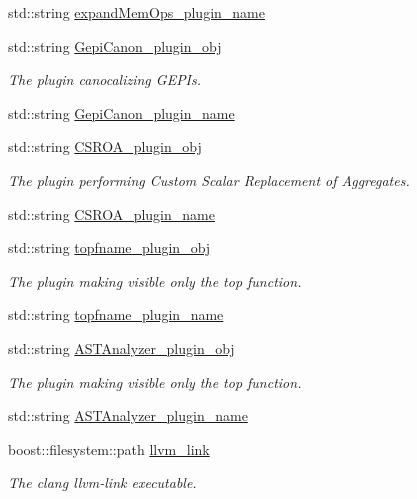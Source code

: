\begin{DoxyCompactItemize}
std\+::string \hyperlink{classGccWrapper_1_1Compiler_a1d172d22af2ec0499c96c54b9641e8fd}{expand\+Mem\+Ops\+\_\+plugin\+\_\+name}
\item 
std\+::string \hyperlink{classGccWrapper_1_1Compiler_a138c2372406ec671bf265a3272faffad}{Gepi\+Canon\+\_\+plugin\+\_\+obj}
\begin{DoxyCompactList}\small\item\em The plugin canocalizing G\+E\+P\+Is. \end{DoxyCompactList}\item 
std\+::string \hyperlink{classGccWrapper_1_1Compiler_ae1a9866ef325dbe330f84cec01cbdf74}{Gepi\+Canon\+\_\+plugin\+\_\+name}
\item 
std\+::string \hyperlink{classGccWrapper_1_1Compiler_af1cd744ca4a45cdcb44c2ab10265e10f}{C\+S\+R\+O\+A\+\_\+plugin\+\_\+obj}
\begin{DoxyCompactList}\small\item\em The plugin performing Custom Scalar Replacement of Aggregates. \end{DoxyCompactList}\item 
std\+::string \hyperlink{classGccWrapper_1_1Compiler_a5154da94a2b88be384431e8a464c7485}{C\+S\+R\+O\+A\+\_\+plugin\+\_\+name}
\item 
std\+::string \hyperlink{classGccWrapper_1_1Compiler_a52c558538405338182b212eba4ffc4bb}{topfname\+\_\+plugin\+\_\+obj}
\begin{DoxyCompactList}\small\item\em The plugin making visible only the top function. \end{DoxyCompactList}\item 
std\+::string \hyperlink{classGccWrapper_1_1Compiler_a8b4c27cca18bafc4d6c1bfa990b6ca61}{topfname\+\_\+plugin\+\_\+name}
\item 
std\+::string \hyperlink{classGccWrapper_1_1Compiler_a21da4c741100306fd078f064aa6f48dc}{A\+S\+T\+Analyzer\+\_\+plugin\+\_\+obj}
\begin{DoxyCompactList}\small\item\em The plugin making visible only the top function. \end{DoxyCompactList}\item 
std\+::string \hyperlink{classGccWrapper_1_1Compiler_a213abeeea7562c9489c2e0ffdd7d468b}{A\+S\+T\+Analyzer\+\_\+plugin\+\_\+name}
\item 
boost\+::filesystem\+::path \hyperlink{classGccWrapper_1_1Compiler_a335a7c20b3bf25ee14796d420b9333ee}{llvm\+\_\+link}
\begin{DoxyCompactList}\small\item\em The clang llvm-\/link executable. \end{DoxyCompactList}\item 

\end{DoxyCompactItemize}
